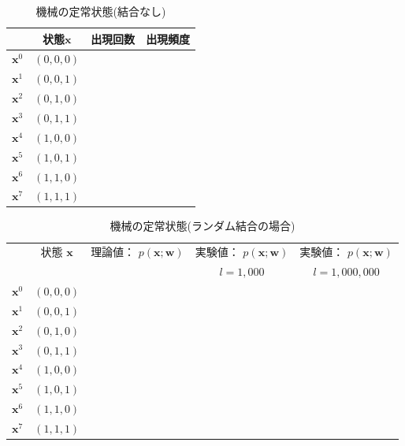 \documentclass[a4j, uplatex, fleqn, dvipdfmx]{jsarticle} %
\begin{document}
\begin{table}[H]
  \caption{機械の定常状態(結合なし)}
  \label{table:q1_a_sample}
  \centering
  \begin{tabular}{|c|c|c|c|}
    \hline
     & 状態$\bm{x}$ & 出現回数 & 出現頻度 \\
    \hline
    $\bm{x}^{0}$ & $(0,0,0)$ & & \\
    $\bm{x}^{1}$ & $(0,0,1)$ & & \\
    $\bm{x}^{2}$ & $(0,1,0)$ & & \\
    $\bm{x}^{3}$ & $(0,1,1)$ & & \\
    $\bm{x}^{4}$ & $(1,0,0)$ & & \\
    $\bm{x}^{5}$ & $(1,0,1)$ & & \\
    $\bm{x}^{6}$ & $(1,1,0)$ & & \\
    $\bm{x}^{7}$ & $(1,1,1)$ & & \\
    \hline
  \end{tabular}
\end{table}

\begin{table}[H]
  \caption{機械の定常状態(ランダム結合の場合)}
  \label{table:q1_b_sample}
  \centering
  \begin{tabular}{|c|c|c|c|c|}
    \hline
     & 状態 $\bm{x}$ & 理論値： $p(\bm{x} ; \bm{w})$ & 実験値： $p(\bm{x} ; \bm{w})$ & 実験値： $p(\bm{x} ; \bm{w})$ \\
     & & & $l=1,000$ & $l=1,000,000$ \\
    \hline
    $\bm{x}^{0}$ & $(0,0,0)$ & & & \\
    $\bm{x}^{1}$ & $(0,0,1)$ & & & \\
    $\bm{x}^{2}$ & $(0,1,0)$ & & & \\
    $\bm{x}^{3}$ & $(0,1,1)$ & & & \\
    $\bm{x}^{4}$ & $(1,0,0)$ & & & \\
    $\bm{x}^{5}$ & $(1,0,1)$ & & & \\
    $\bm{x}^{6}$ & $(1,1,0)$ & & & \\
    $\bm{x}^{7}$ & $(1,1,1)$ & & & \\
    \hline
  \end{tabular}
\end{table}
\end{document}
